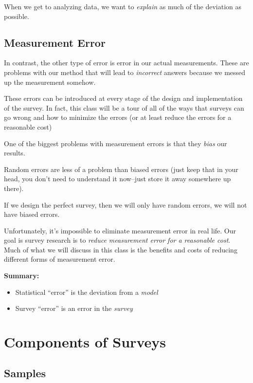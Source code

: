 \documentclass[11pt]{lecturenotes}
\begin{document}
When we get to analyzing data, we want to \emph{explain} as much of the deviation as possible. 

\subsection[10]{Measurement Error} 
\slide
In contrast, the other type of error is error in our actual measurements. These are problems with our method that will lead to \emph{incorrect} answers because we messed up the measurement somehow. 

These errors can be introduced at every stage of the design and implementation of the survey. In fact, this class will be a tour of all of the ways that surveys can go wrong and how to minimize the errors (or at least reduce the errors for a reasonable cost)

One of the biggest problems with measurement errors is that they \emph{bias} our results. 

\slide
{}

\slide
Random errors are less of a problem than biased errors (just keep that in your head, you don't need to understand it now--just store it away somewhere up there).

If we design the perfect survey, then we will only have random errors, we will not have biased errors.

Unfortunately, it's impossible to eliminate measurement error in real life. Our goal is survey research is to \emph{reduce measurement error for a reasonable cost}. Much of what we will discuss in this class is the benefits and costs of reducing different forms of measurement error.

\slide
\textbf{Summary:}
\begin{itemize}
\item Statistical ``error'' is the deviation from a \emph{model}
\item Survey ``error'' is an error in the \emph{survey}
\end{itemize}

\section{Components of Surveys}
\subsection[10]{Samples}
\slide
{}
\end{document}
